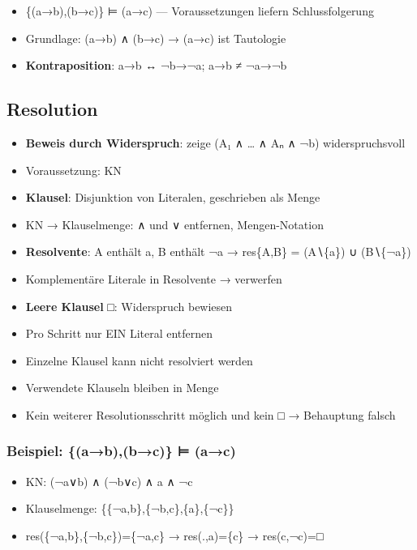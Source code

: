 \documentclass[11pt, a4paper]{article}
\begin{document}
\begin{itemize}
  \item \{(a→b),(b→c)\} ⊨ (a→c) — Voraussetzungen liefern Schlussfolgerung
  \item Grundlage: (a→b) ∧ (b→c) → (a→c) ist Tautologie
  \item \textbf{Kontraposition}: a→b ↔ ¬b→¬a; a→b ≠ ¬a→¬b
\end{itemize}


\subsection{Resolution}

\begin{itemize}
  \item \textbf{Beweis durch Widerspruch}: zeige (A₁ ∧ … ∧ Aₙ ∧ ¬b) widerspruchsvoll
  \item Voraussetzung: KN
  \item \textbf{Klausel}: Disjunktion von Literalen, geschrieben als Menge
  \item KN → Klauselmenge: ∧ und ∨ entfernen, Mengen-Notation
  \item \textbf{Resolvente}: A enthält a, B enthält ¬a → res\{A,B\} = (A∖\{a\}) ∪ (B∖\{¬a\})
  \item Komplementäre Literale in Resolvente → verwerfen
  \item \textbf{Leere Klausel} □: Widerspruch bewiesen
  \item Pro Schritt nur EIN Literal entfernen
  \item Einzelne Klausel kann nicht resolviert werden
  \item Verwendete Klauseln bleiben in Menge
  \item Kein weiterer Resolutionsschritt möglich und kein □ → Behauptung falsch
\end{itemize}


\subsubsection{Beispiel: \{(a→b),(b→c)\} ⊨ (a→c)}
\begin{itemize}
  \item KN: (¬a∨b) ∧ (¬b∨c) ∧ a ∧ ¬c
  \item Klauselmenge: \{\{¬a,b\},\{¬b,c\},\{a\},\{¬c\}\}
  \item res(\{¬a,b\},\{¬b,c\})=\{¬a,c\} → res(.,a)=\{c\} → res(c,¬c)=□
\end{itemize}
\end{document}
